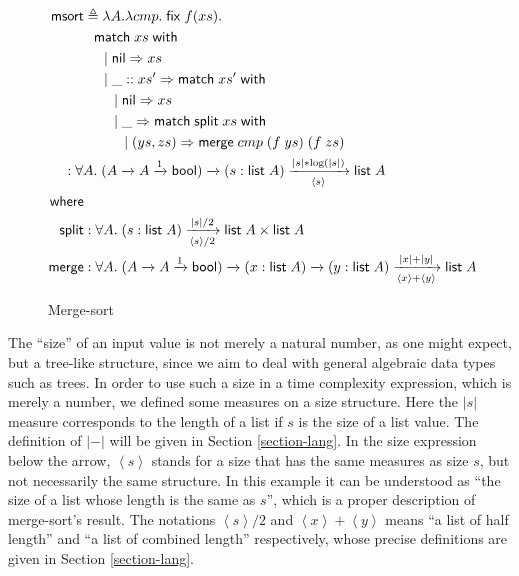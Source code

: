\documentclass[preprint]{sigplanconf}
\newcommand{\arrow}[4]{#1\xrightarrow[#3]{#2}#4}
\newcommand{\symmatch}{\mathsf{match}}
\newcommand{\symwith}{\mathsf{\;with\;}}
\newcommand{\symlist}{\mathsf{list}}
\newcommand{\symnil}{\mathsf{nil}}
\newcommand{\symfix}{\mathsf{fix}}
\newcommand{\symbool}{\mathsf{bool}}
\newcommand{\symmerge}{\mathsf{merge}}
\newcommand{\intro}[2]{(#1 : #2)}
\newcommand{\symmsort}{\mathsf{msort}}
\newcommand{\symsplit}{\mathsf{split}}
\newcommand{\defeq}{\triangleq}
\newcommand{\Sstats}[1]{\left \langle #1 \right \rangle}
\begin{document}
\begin{figure}
\begin{align*}
\symmsort &\defeq \lambda A. \lambda cmp.\;\symfix\;f(xs). \\
& \hspace{.1in} \symmatch\;xs\symwith \\
& \hspace{.2in} |\; \symnil\Rightarrow xs \\
& \hspace{.2in} |\; \_::xs' \Rightarrow \symmatch\;xs'\symwith \\
& \hspace{.3in} |\; \symnil\Rightarrow xs \\
& \hspace{.3in} |\; \_ \Rightarrow \symmatch\; \symsplit\;xs \symwith \\
& \hspace{.4in} |\; (ys, zs) \Rightarrow \symmerge\;cmp\;(f\;ys)\;(f\;zs) \\
& \hspace{-0.2in} : \forall A.\;\arrow{(\arrow{A}{}{}{\arrow{A}{1}{}{\symbool}})}{}{}{\arrow{\intro{s}{\symlist\;A}}{|s|*\log(|s|)}{\Sstats{s}}{\symlist\;A}} \\
\mathsf{where} & \\
\symsplit &: \forall A.\;\arrow{\intro{s}{\symlist\;A}}{|s|/2}{\Sstats{s}/2}{\symlist\;A\times\symlist\;A} \\
\symmerge &: \forall A.\;\arrow{(\arrow{A}{}{}{\arrow{A}{1}{}{\symbool}})}{}{}{\arrow{\intro{x}{\symlist\;A}}{}{}{\arrow{\intro{y}{\symlist\;A}}{|x|+|y|}{\Sstats{x}+\Sstats{y}}{\symlist\;A}}}
\end{align*}
\caption{\label{msort}Merge-sort}
\end{figure}

The ``size'' of an input value is not merely a natural number, as one might expect, but a tree-like structure, since we aim to deal with general algebraic data types such as trees. In order to use such a size in a time complexity expression, which is merely a number, we defined some measures on a size structure. Here the $|s|$ measure corresponds to the length of a list if $s$ is the size of a list value. The definition of $|-|$ will be given in Section \ref{section-lang}. In the size expression below the arrow, $\Sstats{s}$ stands for a size that has the same measures as size $s$, but not necessarily the same structure. In this example it can be understood as ``the size of a list whose length is the same as $s$'', which is a proper description of merge-sort's result.  The notations $\Sstats{s}/2$ and $\Sstats{x}+\Sstats{y}$ means ``a list of half length'' and ``a list of combined length'' respectively, whose precise definitions are given in Section \ref{section-lang}.
\end{document}
